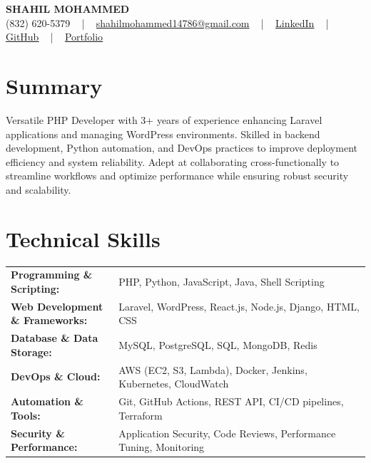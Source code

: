 \documentclass[letterpaper,11pt]{article}
\begin{document}
\begin{center}
    {\fontsize{14pt}{12pt}\selectfont \textbf{\MakeUppercase{Shahil Mohammed}}}\\ \vspace{2pt}
    \fontsize{10pt}{12pt}\selectfont (832) 620-5379 ~ | ~ \href{mailto:shahilmohammed14786@gmail.com}{shahilmohammed14786@gmail.com} ~ | ~  
    \href{https://www.linkedin.com/in/shahil-mohammed-9652931a1/}{\color{blue}\underline{LinkedIn}}  ~ | ~ 
    \href{https://github.com/freakbeast14}{\color{blue}\underline{GitHub}} ~ | ~ 
    \href{https://shahil-mohammed.netlify.app/}{\color{blue}\underline{Portfolio}}
    \vspace{-8pt}
\end{center}

\section{Summary}
\fontsize{9pt}{10pt}\selectfont
Versatile PHP Developer with 3+ years of experience enhancing Laravel applications and managing WordPress environments. Skilled in backend development, Python automation, and DevOps practices to improve deployment efficiency and system reliability. Adept at collaborating cross-functionally to streamline workflows and optimize performance while ensuring robust security and scalability.
 \vspace{-5pt}
 
\section{Technical Skills}
        \vspace{-14pt}
        \begin{table}[h]
            \fontsize{9pt}{10pt}\selectfont
            \begin{tabular}{p{0.3\linewidth} p{0.7\linewidth}}
                \textbf{Programming \& Scripting:} & PHP, Python, JavaScript, Java, Shell Scripting \\
                \textbf{Web Development \& Frameworks:} & Laravel, WordPress, React.js, Node.js, Django, HTML, CSS \\
                \textbf{Database \& Data Storage:} & MySQL, PostgreSQL, SQL, MongoDB, Redis \\
                \textbf{DevOps \& Cloud:} & AWS (EC2, S3, Lambda), Docker, Jenkins, Kubernetes, CloudWatch \\
                \textbf{Automation \& Tools:} & Git, GitHub Actions, REST API, CI/CD pipelines, Terraform \\
                \textbf{Security \& Performance:} & Application Security, Code Reviews, Performance Tuning, Monitoring \\
            \end{tabular}
        \end{table}
 \vspace{-15pt}
 
\end{document}

